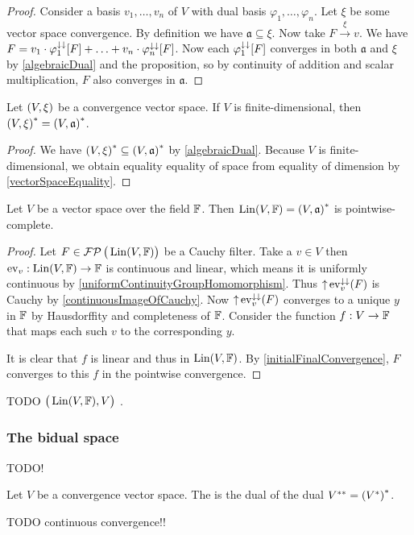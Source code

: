 \begin{proof}
Consider a basis $v_1, \ldots, v_n$ of $V$ with dual basis $\varphi_1, \ldots, \varphi_n$. Let $\xi$ be some vector space convergence. By definition we have $\mathfrak{a} \subseteq \xi$. Now take $F \overset{\xi}{\longrightarrow} v$. We have $F = v_1\cdot \varphi_1^{\downarrow\downarrow}[F] + \ldots + v_n\cdot \varphi_n^{\downarrow\downarrow}[F]$. Now each $\varphi_1^{\downarrow\downarrow}[F]$ converges in both $\mathfrak{a}$ and $\xi$ by \ref{algebraicDual} and the proposition, so by continuity of addition and scalar multiplication, $F$ also converges in $\mathfrak{a}$. 
\end{proof}
\begin{corollary}
Let $\left( V,\xi \right)$ be a convergence vector space. If $V$ is finite-dimensional, then $\left( V,\xi \right)^* = \left( V,\mathfrak{a} \right)^*$.
\end{corollary}
\begin{proof}
We have $\left( V,\xi \right)^* \subseteq \left( V,\mathfrak{a} \right)^*$ by \ref{algebraicDual}. Because $V$ is finite-dimensional, we obtain equality equality of space from equality of dimension by \ref{vectorSpaceEquality}.
\end{proof}

\begin{proposition} \label{algebraicDualComplete}
Let $V$ be a vector space over the field $\mathbb{F}$. Then $\operatorname{Lin}(V,\mathbb{F}) = {\left( V, \mathfrak{a} \right)}^*$ is pointwise-complete.
\end{proposition}
\begin{proof}
Let $F\in\operatorname{\mathcal{FP}}\big(\operatorname{Lin}(V,\mathbb{F})\big)$ be a Cauchy filter. Take a $v\in V$ then $\operatorname{ev}_v: \operatorname{Lin}(V,\mathbb{F})\to \mathbb{F}$ is continuous and linear, which means it is uniformly continuous by \ref{uniformContinuityGroupHomomorphism}. Thus $\operatorname{\uparrow}\operatorname{ev}_v^{\downarrow\downarrow}(F)$ is Cauchy by \ref{continuousImageOfCauchy}. Now $\operatorname{\uparrow}\operatorname{ev}_v^{\downarrow\downarrow}(F)$ converges to a unique $y$ in $\mathbb{F}$ by Hausdorffity and completeness of $\mathbb{F}$. Consider the function $f: V\to \mathbb{F}$ that maps each such $v$ to the corresponding $y$.

It is clear that $f$ is linear and thus in $\operatorname{Lin}(V,\mathbb{F})$. By \ref{initialFinalConvergence}, $F$ converges to this $f$ in the pointwise convergence.
\end{proof}
TODO $\big(\operatorname{Lin}(V,\mathbb{F}),V\big)$ .

\subsubsection{The bidual space}
TODO!
\begin{definition}
Let $V$ be a convergence vector space. The  is the dual of the dual ${V}^{**} = {({V}^*)}^*$.
\end{definition}
TODO continuous convergence!!

